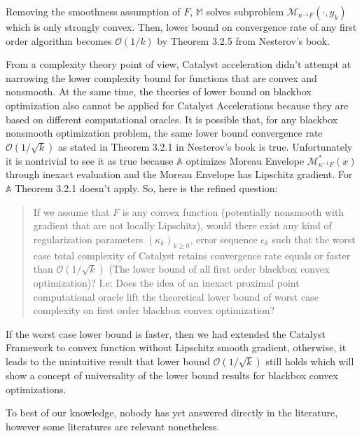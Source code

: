 \documentclass[12pt]{article}
\begin{document}
            Removing the smoothness assumption of $F$, $\mathbb M$ solves subproblem $\mathcal M_{\kappa^{-1}F}(\cdot, y_k)$ which is only strongly convex.
            Then, lower bound on convergence rate of any first order algorithm becomes $\mathcal O(1/k)$ by Theorem 3.2.5 from Nesterov's book. 
            \par
            From a complexity theory point of view, Catalyst acceleration didn't attempt at narrowing the lower complexity bound for functions that are convex and nonsmooth. 
            At the same time, the theories of lower bound on blackbox optimization also cannot be applied for Catalyst Accelerations because they are based on different computational oracles. 
            It is possible that, for any blackbox nonsmooth optimization problem, the same lower bound convergence rate $\mathcal O\left(1/\sqrt{k}\right)$ as stated in Theorem 3.2.1 in Nesterov's book \cite{nesterov_lectures_2018} is true. 
            Unfortunately it is nontrivial to see it as true because $\mathbb A$ optimizes Moreau Envelope $\mathcal M^*_{\kappa^{-1}F}(x)$ through inexact evaluation and the Moreau Envelope has Lipschitz gradient. 
            For $\mathbb A$ Theorem 3.2.1 doesn't apply. 
            So, here is the refined question: 
            \begin{quotation}
                If we assume that $F$ is any convex function (potentially nonsmooth with gradient that are not locally Lipschitz), would there exist any kind of regularization parameters $(\kappa_k)_{k \ge 0}$, error sequence $\epsilon_k$ such that the worst case total complexity of Catalyst retains convergence rate equals or faster than $\mathcal O\left(1/\sqrt{k}\right)$ (The lower bound of all first order blackbox convex optimization)? 
                I.e: Does the idea of an inexact proximal point computational oracle lift the theoretical lower bound of worst case complexity on first order blackbox convex optimization? 
            \end{quotation}
            If the worst case lower bound is faster, then we had extended the Catalyst Framework to convex function without Lipschitz smooth gradient, otherwise, it leads to the unintuitive result that lower bound $\mathcal O\left(1/\sqrt{k}\right)$ still holds which will show a concept of universality of the lower bound results for blackbox convex optimizations. 
            \par
            To best of our knowledge, nobody has yet answered directly in the literature, however some literatures are relevant nonetheless. 
\end{document}

